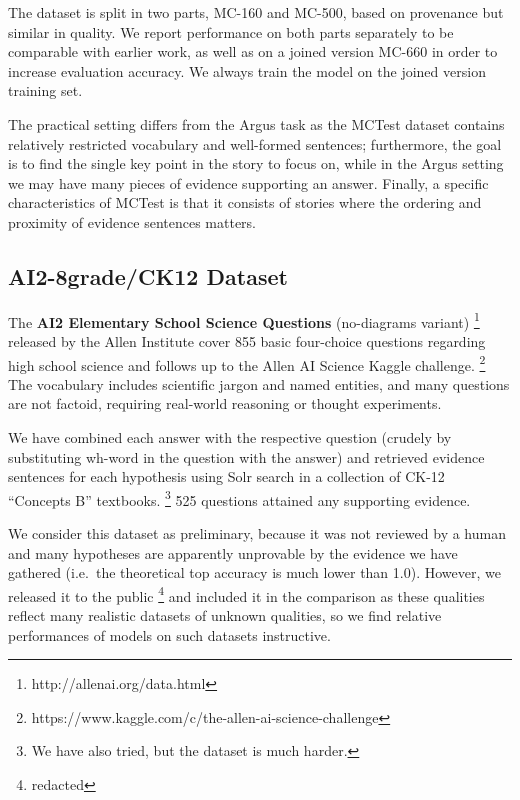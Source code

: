 \documentclass[11pt]{article}
\begin{document}
The dataset is split in two parts, MC-160 and MC-500, based on provenance but
similar in quality.
We report performance on both parts separately to be comparable with earlier
work, as well as on a joined version MC-660 in order to increase evaluation
accuracy.  We always train the model on the joined version training set.

The practical setting differs from the Argus task as the MCTest dataset contains
relatively restricted vocabulary and well-formed sentences; furthermore,
the goal is to find the single key point in the story to focus on, while
in the Argus setting we may have many pieces of evidence supporting an answer.
Finally, a specific characteristics of MCTest is that it consists of stories
where the ordering and proximity of evidence sentences matters.


\subsection{AI2-8grade/CK12 Dataset}

The \textbf{AI2 Elementary School Science Questions} (no-diagrams variant)%
\footnote{http://allenai.org/data.html} released by the Allen Institute
cover 855 basic four-choice questions regarding high school science
and follows up to the Allen AI Science Kaggle challenge.%
\footnote{https://www.kaggle.com/c/the-allen-ai-science-challenge}
The vocabulary includes scientific jargon and named entities, and many questions
are not factoid, requiring real-world reasoning or thought experiments.

We have combined each answer with the respective question (crudely by
substituting wh-word in the question with the answer) and retrieved
evidence sentences for each hypothesis using Solr search in a collection
of CK-12 ``Concepts B'' textbooks.%
\footnote{We have also tried, but the dataset is much harder.}
525 questions attained any supporting evidence.

We consider this dataset as preliminary, because it was not reviewed
by a human and many hypotheses are apparently unprovable by the evidence
we have gathered (i.e.\ the theoretical top accuracy is much lower
than 1.0).  However, we released it to the public%
\footnote{redacted}
and included it in the comparison as these
qualities reflect many realistic datasets of unknown qualities, so
we find relative performances of models on such datasets instructive.
\end{document}
